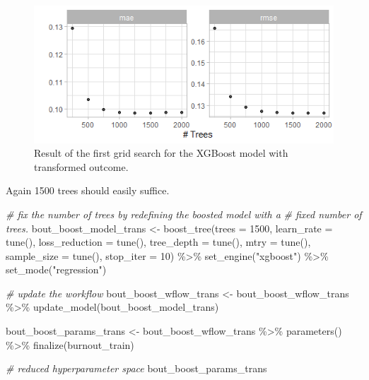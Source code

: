 \documentclass[
]{book}
\newenvironment{Shaded}{\begin{snugshade}}{\end{snugshade}}
\newcommand{\AttributeTok}[1]{\textcolor[rgb]{0.77,0.63,0.00}{#1}}
\newcommand{\CommentTok}[1]{\textcolor[rgb]{0.56,0.35,0.01}{\textit{#1}}}
\newcommand{\DecValTok}[1]{\textcolor[rgb]{0.00,0.00,0.81}{#1}}
\newcommand{\FunctionTok}[1]{\textcolor[rgb]{0.00,0.00,0.00}{#1}}
\newcommand{\NormalTok}[1]{#1}
\newcommand{\OtherTok}[1]{\textcolor[rgb]{0.56,0.35,0.01}{#1}}
\newcommand{\SpecialCharTok}[1]{\textcolor[rgb]{0.00,0.00,0.00}{#1}}
\newcommand{\StringTok}[1]{\textcolor[rgb]{0.31,0.60,0.02}{#1}}
\begin{document}
\begin{figure}

{\centering \includegraphics[width=0.7\linewidth]{_pictures/burn_boost_tune_first_trans} 

}

\caption{Result of the first grid search for the XGBoost model with transformed outcome.}\label{fig:burnboosttunefirsttrans}
\end{figure}

Again 1500 trees should easily suffice.

\begin{Shaded}
\begin{Highlighting}[]
\CommentTok{\# fix the number of trees by redefining the boosted model with a }
\CommentTok{\# fixed number of trees.}
\NormalTok{bout\_boost\_model\_trans }\OtherTok{\textless{}{-}} \FunctionTok{boost\_tree}\NormalTok{(}\AttributeTok{trees =} \DecValTok{1500}\NormalTok{,}
                               \AttributeTok{learn\_rate =} \FunctionTok{tune}\NormalTok{(),}
                               \AttributeTok{loss\_reduction =} \FunctionTok{tune}\NormalTok{(),}
                               \AttributeTok{tree\_depth =} \FunctionTok{tune}\NormalTok{(),}
                               \AttributeTok{mtry =} \FunctionTok{tune}\NormalTok{(),}
                               \AttributeTok{sample\_size =} \FunctionTok{tune}\NormalTok{(),}
                               \AttributeTok{stop\_iter =} \DecValTok{10}\NormalTok{) }\SpecialCharTok{\%\textgreater{}\%}
  \FunctionTok{set\_engine}\NormalTok{(}\StringTok{"xgboost"}\NormalTok{) }\SpecialCharTok{\%\textgreater{}\%} 
  \FunctionTok{set\_mode}\NormalTok{(}\StringTok{"regression"}\NormalTok{)}

\CommentTok{\# update the workflow}
\NormalTok{bout\_boost\_wflow\_trans }\OtherTok{\textless{}{-}}
\NormalTok{  bout\_boost\_wflow\_trans }\SpecialCharTok{\%\textgreater{}\%}
  \FunctionTok{update\_model}\NormalTok{(bout\_boost\_model\_trans)}

\NormalTok{bout\_boost\_params\_trans }\OtherTok{\textless{}{-}}\NormalTok{ bout\_boost\_wflow\_trans }\SpecialCharTok{\%\textgreater{}\%}
  \FunctionTok{parameters}\NormalTok{() }\SpecialCharTok{\%\textgreater{}\%}
  \FunctionTok{finalize}\NormalTok{(burnout\_train)}

\CommentTok{\# reduced hyperparameter space}
\NormalTok{bout\_boost\_params\_trans}
\end{Highlighting}
\end{Shaded}
\end{document}
